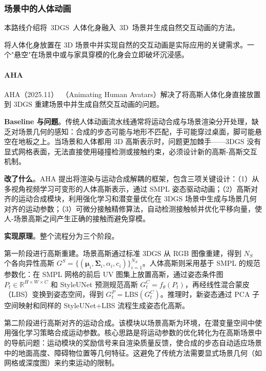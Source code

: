 \subsubsection{场景中的人体动画}

本路线介绍将~3DGS~人体化身融入~3D~场景并生成自然交互动画的方法。

将人体化身放置在 3D 场景中并实现自然的交互动画是实际应用的关键需求。一个"悬空"在场景中或与家具穿模的化身会立即破坏沉浸感。

\paragraph{AHA}

AHA（2025.11）~\cite{2511_09827}（Animating Human Avatars）解决了将高斯人体化身直接放置到 3DGS 重建场景中并生成自然交互动画的问题。

\textbf{Baseline 与问题}。传统人体动画流水线通常将运动合成与场景渲染分开处理，缺乏对场景几何的感知：合成的步态可能与地形不匹配，手可能穿过桌面，脚可能悬空在地板之上。当场景和人体都用 3D 高斯表示时，问题更加棘手——3DGS 没有显式网格表面，无法直接使用碰撞检测或接触约束，必须设计新的高斯-高斯交互机制。

\textbf{改了什么}。AHA 提出将渲染与运动合成解耦的框架，包含三项关键设计：（1）从多视角视频学习可变形的人体高斯表示，通过 SMPL 姿态驱动动画；（2）高斯对齐的运动合成模块，利用强化学习和潜变量优化在 3DGS 场景中生成与场景几何对齐的运动参数；（3）可微分接触精修算法，自动检测接触帧并优化平移向量，使人-场景高斯之间产生正确的接触而避免穿模。

\textbf{实现原理}。整个流程分为三个阶段。

第一阶段进行高斯重建。场景高斯通过标准 3DGS 从 RGB 图像重建，得到 $N_S$ 个各向异性高斯 $G^S = \{(\boldsymbol{\mu}_i, \boldsymbol{\Sigma}_i, \alpha_i, c_i)\}_{i=1}^{N_S}$。人体高斯则采用基于 SMPL 的规范参数化：在 SMPL 网格的前后 UV 图集上放置高斯，通过姿态条件图 $P_t \in \mathbb{R}^{H \times W \times C}$ 和 StyleUNet 预测规范高斯 $G^C_t = f_\theta(P_t)$，再经线性混合蒙皮（LBS）变换到姿态空间，得到 $G^P_t = \text{LBS}(G^C_t)$。推理时，新姿态通过 PCA 子空间映射和同样的 StyleUNet+LBS 流程生成姿态化高斯。

第二阶段进行高斯对齐的运动合成。该模块以场景高斯为环境，在潜变量空间中使用强化学习策略合成运动参数。核心思路是将运动参数的优化转化为在高斯场景中的导航问题：运动模块的奖励信号来自渲染质量反馈，使合成的步态自动适应场景中的地面高度、障碍物位置等几何特征。这避免了传统方法需要显式场景几何（如网格或深度图）来约束运动的限制。

